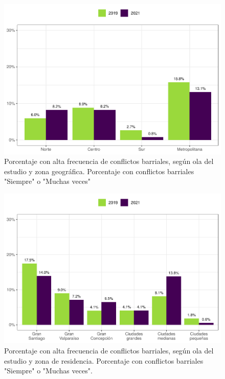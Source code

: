 \documentclass[
  12pt,
  openany]{book}
\begin{document}
\begin{figure}

{\centering \includegraphics{reporte-elsoc_files/figure-latex/confli-zona-1} 

}

\caption{Porcentaje con alta frecuencia de conflictos barriales, según ola del estudio y zona geográfica. Porcentaje con conflictos barriales "Siempre" o "Muchas veces"}\label{fig:confli-zona}
\end{figure}

\begin{figure}

{\centering \includegraphics{reporte-elsoc_files/figure-latex/confli-estrato-1} 

}

\caption{Porcentaje con alta frecuencia de conflictos barriales, según ola del estudio y zona de residencia. Porcentaje con conflictos barriales "Siempre" o "Muchas veces".}\label{fig:confli-estrato}
\end{figure}
\end{document}
